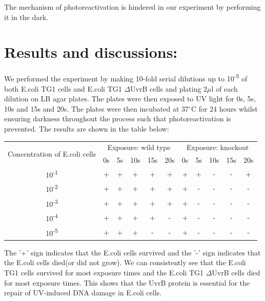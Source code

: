 \documentclass{report}
\begin{document}
The mechanism of photoreactivation is hindered in our experiment by performing it in the dark.




\section*{Results and discussions:}
We performed the experiment by making 10-fold serial dilutions up to 10\textsuperscript{-5} of both E.coli TG1 cells and
E.coli TG1 $\Delta$UvrB cells and plating 2$\mu$l of each dilution on LB agar plates. The plates were then exposed to UV light for 0s, 5s, 10s and 15s and 20s.
The plates were then incubated at 37$^{\circ}$C for 24 hours whilst ensuring darkness throughout the process such that photoreactivation is prevented. The results are shown in the table below:


\begin{center}
    \begin{tabular}{|c|c|c|c|c|c|c|c|c|c|c|}
        \hline
        \multirow{2}{*}{Concentration of E.coli cells} & \multicolumn{5}{c|}{Exposure: wild type} & \multicolumn{5}{c|}{Exposure: knockout} \\
        \cline{2-11}
         & 0s & 5s & 10s & 15s & 20s & 0s & 5s & 10s & 15s & 20s \\
        \hline
        10\textsuperscript{-1} & + & + & + & + & + & + & + & - & - & + \\
        \hline
        10\textsuperscript{-2} & + & + & + & + & + & + & - & - & - & - \\
        \hline
        10\textsuperscript{-3} & + & + & + & + & + & + & - & - & - & - \\
        \hline
        10\textsuperscript{-4} & + & + & + & + & - & + & - & - & - & - \\
        \hline
        10\textsuperscript{-5} & + & + & + & - & - & + & - & - & - & - \\
        \hline
        
    \end{tabular}
\end{center}

The '+' sign indicates that the E.coli cells survived and the '-' sign indicates that the E.coli cells died(or did not grow).
We can consistently see that the E.coli TG1 cells survived for most exposure times and the E.coli TG1 $\Delta$UvrB cells died for most exposure times.
This shows that the UvrB protein is essential for the repair of UV-induced DNA damage in E.coli cells.
\end{document}
